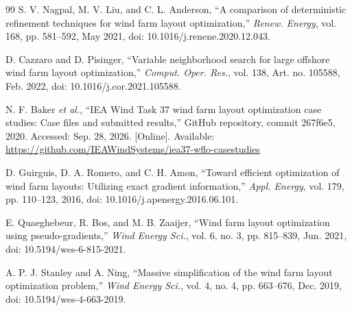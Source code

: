 {\begin{thebibliography}{99}
S. V. Nagpal, M. V. Liu, and C. L. Anderson, ``A comparison of deterministic refinement techniques for wind farm layout optimization,'' \textit{Renew. Energy}, vol. 168, pp. 581--592, May 2021, doi: 10.1016/j.renene.2020.12.043.

D. Cazzaro and D. Pisinger, ``Variable neighborhood search for large offshore wind farm layout optimization,'' \textit{Comput. Oper. Res.}, vol. 138, Art. no. 105588, Feb. 2022, doi: 10.1016/j.cor.2021.105588.

N. F. Baker \textit{et al.}, ``IEA Wind Task 37 wind farm layout optimization case studies: Case files and submitted results,'' GitHub repository, commit 267f6e5, 2020. Accessed: Sep. 28, 2026. [Online]. Available: \url{https://github.com/IEAWindSystems/iea37-wflo-casestudies}

D. Guirguis, D. A. Romero, and C. H. Amon, ``Toward efficient optimization of wind farm layouts: Utilizing exact gradient information,'' \textit{Appl. Energy}, vol. 179, pp. 110--123, 2016, doi: 10.1016/j.apenergy.2016.06.101.

E. Quaeghebeur, R. Bos, and M. B. Zaaijer, ``Wind farm layout optimization using pseudo-gradients,'' \textit{Wind Energy Sci.}, vol. 6, no. 3, pp. 815--839, Jun. 2021, doi: 10.5194/wes-6-815-2021.

A. P. J. Stanley and A. Ning, ``Massive simplification of the wind farm layout optimization problem,'' \textit{Wind Energy Sci.}, vol. 4, no. 4, pp. 663--676, Dec. 2019, doi: 10.5194/wes-4-663-2019.


\end{thebibliography}}
